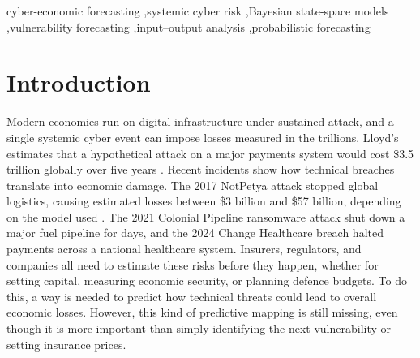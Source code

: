 \documentclass[review]{elsarticle}
\begin{document}
\begin{frontmatter}
\address[label1]{Universidade Federal da Para\'{i}ba, Brazil}
\address[label2]{University of Fairfax, Kentucky, United States}
\address[label3]{ShadowMatrix CDF, Prague, Czechia}



\begin{keyword}
cyber-economic forecasting \sep systemic cyber risk \sep Bayesian state-space models \sep vulnerability forecasting \sep input--output analysis \sep probabilistic forecasting
\end{keyword}

\end{frontmatter}

\section{Introduction}
\label{introduction}
Modern economies run on digital infrastructure under sustained attack, and a single systemic cyber event can impose losses measured in the trillions. Lloyd's estimates that a hypothetical attack on a major payments system would cost \$3.5 trillion globally over five years \citep{lloyds2023}. Recent incidents show how technical breaches translate into economic damage. The 2017 NotPetya attack stopped global logistics, causing estimated losses between \$3 billion and \$57 billion, depending on the model used \citep{welburn2022}. The 2021 Colonial Pipeline ransomware attack shut down a major fuel pipeline for days, and the 2024 Change Healthcare breach halted payments across a national healthcare system. Insurers, regulators, and companies all need to estimate these risks before they happen, whether for setting capital, measuring economic security, or planning defence budgets. To do this, a way is needed to predict how technical threats could lead to overall economic losses. However, this kind of predictive mapping is still missing, even though it is more important than simply identifying the next vulnerability or setting insurance prices.
\end{document}
